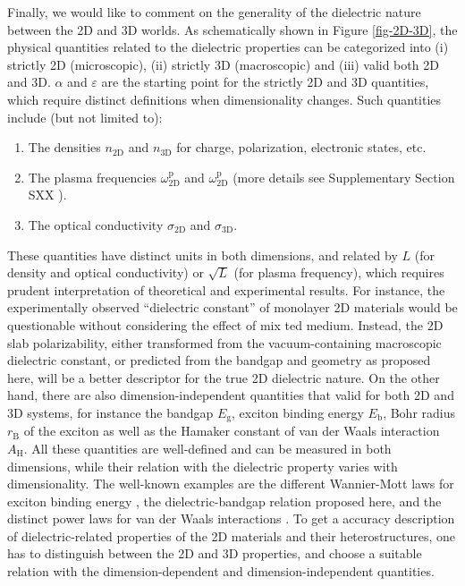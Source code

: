 \documentclass[journal=ancac3,manuscript=article,email=true,hyperref=true,keywords=false]{achemso}
\begin{document}
Finally, we would like to comment on the generality of the dielectric
nature between the 2D and 3D worlds. As schematically shown in Figure
\ref{fig-2D-3D}, the physical quantities related to the dielectric
properties can be categorized into (i) strictly 2D (microscopic), (ii)
strictly 3D (macroscopic) and (iii) valid both 2D and 3D.  $\alpha$
and $\varepsilon$ are the starting point for the strictly 2D and 3D
quantities, which require distinct definitions when dimensionality
changes. Such quantities include (but not limited to):
\begin{enumerate}
\item The densities $n_{\mathrm{2D}}$ and $n_{\mathrm{3D}}$ for
  charge, polarization, electronic states, etc.
  
\item The plasma frequencies $\omega^{\mathrm{p}}_{\mathrm{2D}}$ and
  $\omega^{\mathrm{p}}_{\mathrm{2D}}$\cite{Nazarov_2015_2D_3D} (more
  details see Supplementary Section SXX ).

\item The optical conductivity $\sigma_{\mathrm{2D}}$ and
  $\sigma_{\mathrm{3D}}$\cite{Bechstedt_2012,Matthes_2016}.
\end{enumerate}
These quantities have distinct units in both dimensions, and related
by $L$ (for density and optical conductivity) or $\sqrt{L}$ (for
plasma frequency), which requires prudent interpretation of
theoretical and experimental results. For instance, the experimentally
observed ``dielectric constant'' of monolayer 2D materials
\cite{Ning_2015,Li_2014,Yao_2014,Wu_2015} would be questionable
without considering the effect of mix ted medium. Instead, the 2D slab
polarizability, either transformed from the vacuum-containing
macroscopic dielectric constant, or predicted from the bandgap and
geometry as proposed here, will be a better descriptor for the true 2D
dielectric nature. On the other hand, there are also
dimension-independent quantities that valid for both 2D and 3D
systems, for instance the bandgap $E_{\mathrm{g}}$, exciton binding
energy $E_{\mathrm{b}}$, Bohr radius $r_{\mathrm{B}}$ of the exciton
as well as the Hamaker constant of van der Waals interaction
$A_{\mathrm{H}}$. All these quantities are well-defined and can be
measured in both dimensions, while their relation with the dielectric
property varies with dimensionality. The well-known examples are the
different Wannier-Mott laws for exciton binding energy
\cite{Olsen_2016_hydrogen}, the dielectric-bandgap relation
proposed here, and the distinct power laws for van der Waals
interactions \cite{Gobre_2013}. To get a accuracy description of
dielectric-related properties of the 2D materials and their
heterostructures, one has to distinguish between the 2D and 3D
properties, and choose a suitable relation with the
dimension-dependent and dimension-independent quantities.
\end{document}
